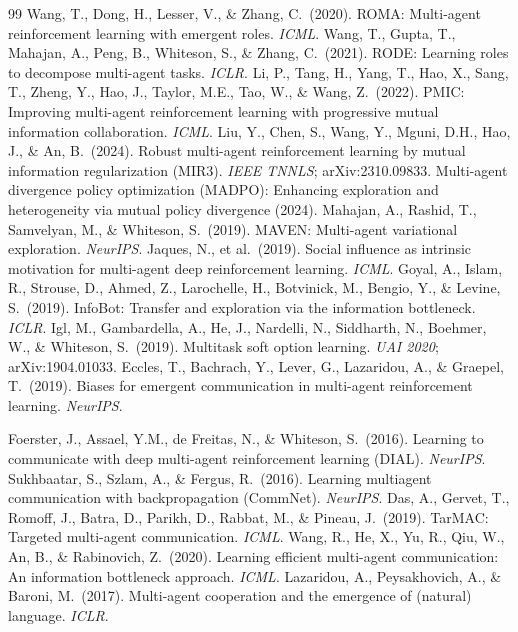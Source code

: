 \documentclass[10pt, letterpaper]{article}
\begin{document}
\begin{thebibliography}{99}
 Wang, T., Dong, H., Lesser, V., \& Zhang, C.\ (2020). ROMA: Multi-agent reinforcement learning with emergent roles. \emph{ICML}.
 Wang, T., Gupta, T., Mahajan, A., Peng, B., Whiteson, S., \& Zhang, C.\ (2021). RODE: Learning roles to decompose multi-agent tasks. \emph{ICLR}.
 Li, P., Tang, H., Yang, T., Hao, X., Sang, T., Zheng, Y., Hao, J., Taylor, M.E., Tao, W., \& Wang, Z.\ (2022). PMIC: Improving multi-agent reinforcement learning with progressive mutual information collaboration. \emph{ICML}.
 Liu, Y., Chen, S., Wang, Y., Mguni, D.H., Hao, J., \& An, B.\ (2024). Robust multi-agent reinforcement learning by mutual information regularization (MIR3). \emph{IEEE TNNLS}; arXiv:2310.09833.
 Multi-agent divergence policy optimization (MADPO): Enhancing exploration and heterogeneity via mutual policy divergence (2024).
 Mahajan, A., Rashid, T., Samvelyan, M., \& Whiteson, S.\ (2019). MAVEN: Multi-agent variational exploration. \emph{NeurIPS}.
 Jaques, N., et al.\ (2019). Social influence as intrinsic motivation for multi-agent deep reinforcement learning. \emph{ICML}.
 Goyal, A., Islam, R., Strouse, D., Ahmed, Z., Larochelle, H., Botvinick, M., Bengio, Y., \& Levine, S.\ (2019). InfoBot: Transfer and exploration via the information bottleneck. \emph{ICLR}.
 Igl, M., Gambardella, A., He, J., Nardelli, N., Siddharth, N., Boehmer, W., \& Whiteson, S.\ (2019). Multitask soft option learning. \emph{UAI 2020}; arXiv:1904.01033.
 Eccles, T., Bachrach, Y., Lever, G., Lazaridou, A., \& Graepel, T.\ (2019). Biases for emergent communication in multi-agent reinforcement learning. \emph{NeurIPS}.

 Foerster, J., Assael, Y.M., de Freitas, N., \& Whiteson, S.\ (2016). Learning to communicate with deep multi-agent reinforcement learning (DIAL). \emph{NeurIPS}.
 Sukhbaatar, S., Szlam, A., \& Fergus, R.\ (2016). Learning multiagent communication with backpropagation (CommNet). \emph{NeurIPS}.
 Das, A., Gervet, T., Romoff, J., Batra, D., Parikh, D., Rabbat, M., \& Pineau, J.\ (2019). TarMAC: Targeted multi-agent communication. \emph{ICML}.
 Wang, R., He, X., Yu, R., Qiu, W., An, B., \& Rabinovich, Z.\ (2020). Learning efficient multi-agent communication: An information bottleneck approach. \emph{ICML}.
 Lazaridou, A., Peysakhovich, A., \& Baroni, M.\ (2017). Multi-agent cooperation and the emergence of (natural) language. \emph{ICLR}.


\end{thebibliography}
\end{document}
